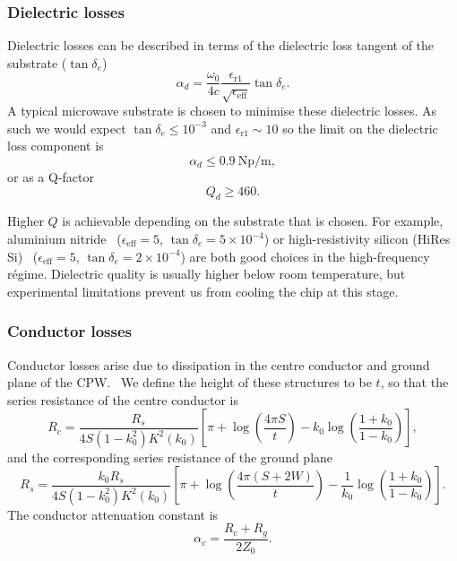 \subsubsection*{Dielectric losses}

Dielectric losses can be described in terms of the dielectric loss tangent of
the substrate ($\tan \delta_e$) ~\cite{Collin2007}
\begin{equation}
  \alpha_d =
  \frac{\omega_0}{4c}\frac{\epsilon_\mathrm{r1}}{\sqrt{\epsilon_\mathrm{eff}}}
  \tan \delta_e.
\end{equation}
A typical microwave substrate is chosen to minimise these dielectric losses. As
such we would expect $\tan\delta_e\leq10^{-3}$ and
$\epsilon_\mathrm{r1} \sim 10$ so the limit on the dielectric loss component is
%
%
\begin{equation}
  \alpha_d \leq \SI{0.9}{\neper\per\meter},
\end{equation}
or as a Q-factor
\begin{equation}
  Q_d \geq 460.
\end{equation}

Higher $Q$ is achievable depending on the substrate that is chosen. For example,
aluminium nitride~\cite{mw101}  ($\epsilon_\mathrm{eff}=5$, $\tan\delta_e = 5\times10^{-4}$)
or high-resistivity silicon (HiRes Si)~\cite{1717770}
($\epsilon_\mathrm{eff}=5$, $\tan\delta_e =2\times10^{-4}$) are both good
choices in the high-frequency r\'egime.  Dielectric quality is usually higher
below room temperature, but experimental limitations prevent us from cooling the
chip at this stage.

\subsubsection*{Conductor losses}

Conductor losses arise due to dissipation in the centre conductor and ground
plane of the CPW.~\cite{Simons2004} We define the height of these structures to
be $t$, so that the series resistance of the centre conductor is
\begin{equation}
  R_c = \frac{R_s}{4 S(1-k_0^2)K^2(k_0)}\left[ \pi + \log\left(\frac{4\pi
  S}{t}\right) - k_0\log\left(\frac{1+k_0}{1-k_0}\right) \right],
\end{equation}
and the corresponding series resistance of the ground plane
\begin{equation}
  R_s = \frac{k_0 R_s}{4S(1-k_0^2)K^2(k_0)}\left[\pi +
  \log\left(\frac{4\pi(S+2W)}{t}\right) -
  \frac{1}{k_0}\log\left(\frac{1+k_0}{1-k_0}\right)\right].
\end{equation}
The conductor attenuation constant is
\begin{equation}
  \alpha_c = \frac{R_c +R_g}{2Z_0}.
\end{equation}

